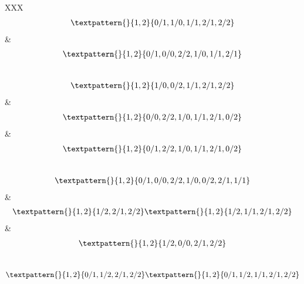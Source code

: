 \begin{center}
\begin{longtabu}[l]{XXX}
\begin{equation}
	\begin{gathered}
		\textpattern{}{1,2}{0/1,1/0,1/1,2/1,2/2}
	\end{gathered}
	\label{cls:159}
\end{equation}
&
\begin{equation}
	\begin{gathered}
		\textpattern{}{1,2}{0/1,0/0,2/2,1/0,1/1,2/1}
	\end{gathered}
	\label{cls:160}
\end{equation}
\\
\begin{equation}
	\begin{gathered}
		\textpattern{}{1,2}{1/0,0/2,1/1,2/1,2/2}
	\end{gathered}
	\label{cls:161}
\end{equation}
&
\begin{equation}
	\begin{gathered}
		\textpattern{}{1,2}{0/0,2/2,1/0,1/1,2/1,0/2}
	\end{gathered}
	\label{cls:162}
\end{equation}
&
\begin{equation}
	\begin{gathered}
		\textpattern{}{1,2}{0/1,2/2,1/0,1/1,2/1,0/2}
	\end{gathered}
	\label{cls:163}
\end{equation}
\\
\begin{equation}
	\begin{gathered}
		\textpattern{}{1,2}{0/1,0/0,2/2,1/0,0/2,2/1,1/1}
	\end{gathered}
	\label{cls:164}
\end{equation}
&
\begin{equation}
	\begin{gathered}
		\textpattern{}{1,2}{1/2,2/1,2/2}
		\textpattern{}{1,2}{1/2,1/1,2/1,2/2}
	\end{gathered}
	\label{cls:165}
\end{equation}
&
\begin{equation}
	\begin{gathered}
		\textpattern{}{1,2}{1/2,0/0,2/1,2/2}
	\end{gathered}
	\label{cls:166}
\end{equation}
\\
\begin{equation}
	\begin{gathered}
		\textpattern{}{1,2}{0/1,1/2,2/1,2/2}
		\textpattern{}{1,2}{0/1,1/2,1/1,2/1,2/2}

\end{gathered}
\end{equation}
\end{longtabu}
\end{center}
